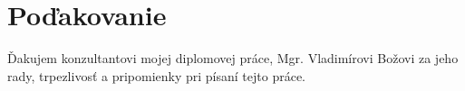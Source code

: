 \newpage

\section*{Poďakovanie}
Ďakujem konzultantovi mojej diplomovej práce, Mgr. Vladimírovi Božovi za jeho rady, trpezlivosť a pripomienky pri písaní tejto práce.